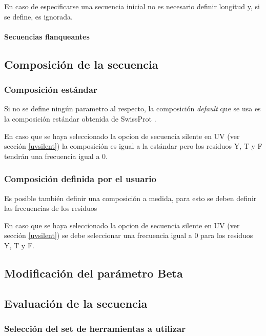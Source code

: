 En caso de especificarse una secuencia inicial no es necesario definir longitud y, si se define, es ignorada.


\paragraph{Secuencias flanqueantes}\label{flanqueantes}

\subsection{Composición de la secuencia} \label{composicion}

\subsubsection{Composición estándar}
Si no se define ningún parametro al respecto, la composición \textit{default} que se usa es la composición estándar obtenida de SwissProt \cite{compositionAA}.  

En caso que se haya seleccionado la opcion de secuencia silente en UV (ver sección \ref{uvsilent}) la composición es igual a la estándar pero los residuos Y, T y F tendrán una frecuencia igual a 0.

\subsubsection{Composición definida por el usuario}
Es posible también definir una composición a medida, para esto se deben definir las frecuencias de los residuos

En caso que se haya seleccionado la opcion de secuencia silente en UV (ver sección \ref{uvsilent}) se debe seleccionar una frecuencia igual a 0 para los residuos Y, T y F. 


\subsection{Modificación del parámetro Beta}


\subsection{Evaluación de la secuencia}\label{evaluacion}


\subsubsection{Selección del set de herramientas a utilizar}


